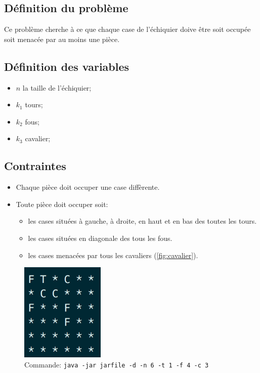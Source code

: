 \documentclass[letterpaper]{article}
\begin{document}
\subsection{Définition du problème}

Ce problème cherche à ce que chaque case de l'échiquier doive être soit
occupée soit menacée par au moins une pièce.

\subsection{Définition des variables}

\begin{itemize}
\item $n$ la taille de l'échiquier;
\item $k_1$ tours;
\item $k_2$ fous;
\item $k_3$ cavalier;
\end{itemize}

\subsection{Contraintes}

\begin{itemize}
\item Chaque pièce doit occuper une case diffèrente.
\item Toute pièce doit occuper soit:
  \begin{itemize}
  \item les cases situées à gauche, à droite, en haut et en bas des
    toutes les tours.
  \item les cases situées en diagonale des tous les fous.
  \item les cases menacées par tous les cavaliers (\ref{fig:cavalier}).
  \end{itemize}
\end{itemize}

\begin{figure}[ht]
  \centering
  \label{fig:ss-domination}
  \includegraphics[width=4cm]{fig/ss-domination.png}
  \caption{Commande: \texttt{java -jar jarfile -d -n 6 -t 1 -f 4 -c 3}}
\end{figure}
\end{document}
